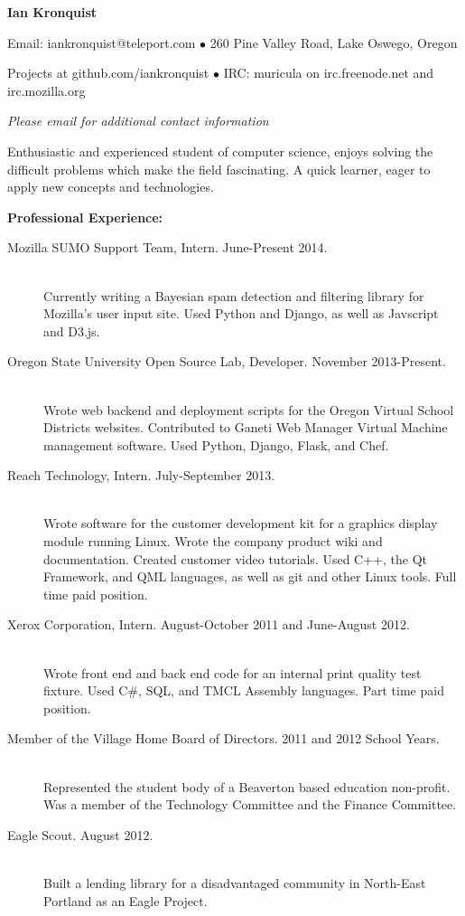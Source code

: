 \documentclass[11pt]{article}
\begin{document}
\centerline{{\LARGE \bf Ian Kronquist}}

\bigskip

\centerline{
	Email: iankronquist@teleport.com
	$\bullet$
	260 Pine Valley Road, Lake Oswego, Oregon
}
\centerline{
	Projects at github.com/iankronquist
	$\bullet$
        IRC: muricula on irc.freenode.net and irc.mozilla.org
}
\centerline{
        \emph{
		Please email for additional contact information
	}
}


\bigskip
\hrulefill
\bigskip

\large
Enthusiastic and experienced student of computer science, enjoys solving the 
difficult problems which make the field fascinating. A quick learner, eager 
to apply new concepts and technologies.

\bigskip

{\Large \bf Professional Experience:}
\normalsize
\begin{description}
	\item[Mozilla SUMO Support Team, Intern.
		\hfill June-Present 2014.]
		\hfill \\
		Currently writing a Bayesian spam detection and filtering library for
        Mozilla's user input site.
		Used Python and Django, as well as Javscript and D3.js.

	\item[Oregon State University Open Source Lab, Developer.
		\hfill November 2013-Present.]
		\hfill \\
		Wrote web backend and deployment scripts for the 
		Oregon Virtual School Districts websites. 
		Contributed to Ganeti Web Manager Virtual Machine 
		management software. Used Python, Django, Flask, and Chef. 
	\item[Reach Technology, Intern.
		\hfill July-September 2013.]
		\hfill \\
		Wrote software for the customer development kit for a graphics
		display module running Linux. Wrote the company product wiki 
		and documentation. Created customer video tutorials. Used C++,
		the Qt Framework, and QML languages, as well as git and other 
		Linux tools. Full time paid position. 
	\item[Xerox Corporation, Intern.
		\hfill  August-October 2011 and June-August 2012.]
		\hfill \\
		Wrote front end and back end code for an internal print quality
	 	test fixture.
		Used C\#, SQL, and TMCL Assembly languages.
		Part time paid position.  
	\item[Member of the Village Home Board of Directors.
		\hfill 2011 and 2012 School Years.]
		\hfill \\
		Represented the student body of a Beaverton based education 
		non-profit.
		Was a member of the Technology Committee and the Finance 
		Committee.
	\item[Eagle Scout.
		\hfill August 2012.]
		\hfill \\
		Built a lending library for a disadvantaged community in 
		North-East Portland as an Eagle Project.
\end{description}
\end{document}
